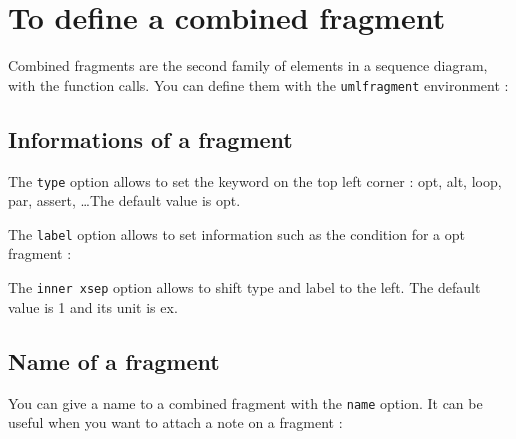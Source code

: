 \documentclass[a4paper,11pt]{report}
\newcommand{\inputTikZ}[1]{%
  }%
\newcommand{\inputTikZ}[1]{%
    \texttt{[image: fig/\#1.pdf]}%
  }%
\begin{document}
\section{To define a combined fragment}\label{s.fragments}

Combined fragments are the second family of elements in a sequence diagram, with the function calls. You can define them with the {\tt umlfragment} environment :

\medskip

\begin{minipage}{0.5\textwidth}

\end{minipage}
\begin{minipage}{0.5\textwidth}
\begin{center}
\inputTikZ{fragment}
\end{center}
\end{minipage}

\subsection{Informations of a fragment}\label{ss.fraginfos}

The {\tt type} option allows to set the keyword on the top left corner : opt, alt, loop, par, assert, \ldots The default value is opt.

The {\tt label} option allows to set information such as the condition for a opt fragment :

\medskip

\begin{minipage}{0.5\textwidth}

\end{minipage}
\begin{minipage}{0.5\textwidth}
\begin{center}
\inputTikZ{fragmentlabel}
\end{center}
\end{minipage}

\medskip

The {\tt inner xsep} option allows to shift type and label to the left. The default value is 1 and its unit is ex.

\subsection{Name of a fragment}\label{ss.fragname}

You can give a name to a combined fragment with the {\tt name} option. It can be useful when you want to attach a note on a fragment :
\end{document}
